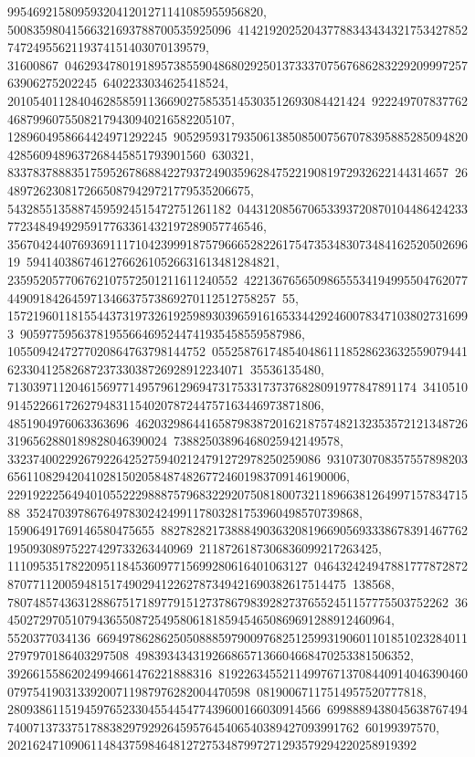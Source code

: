 {{{9954692158095932041201271141085955956820, 50083598041566321693788700535925096\
4142192025204377883434343217534278527472495562119374151403070139579, 31600867\
04629347801918957385590486802925013733370756768628322920999725763906275202245\
6402233034625418524, 20105401128404628585911366902758535145303512693084421424\
92224970783776246879960755082179430940216582205107, 1289604958664424971292245\
90529593179350613850850075670783958852850948204285609489637268445851793901560\
630321, 833783788835175952678688422793724903596284752219081972932622144314657\
2648972623081726650879429721779535206675, 54328551358874595924515472751261182\
0443120856706533937208701044864242337723484949295917763361432197289057746546, 
   35670424407693691117104239991875796665282261754735348307348416252050269619\
594140386746127662610526631613481284821, 235952057706762107572501211611240552\
42213676565098655534194995504762077449091842645971346637573869270112512758257\
55, 1572196011815544373197326192598930396591616533442924600783471038027316993\
90597759563781955664695244741935458559587986, 1055094247277020864763798144752\
05525876174854048611185286236325590794416233041258268723733038726928912234071\
35536135480, 7130397112046156977149579612969473175331737376828091977847891174\
34105109145226617262794831154020787244757163446973871806, 4851904976063363696\
46203298644165879838720162187574821323535721213487263196562880189828046390024\
73882503896468025942149578, 3323740022926792264252759402124791272978250259086\
931073070835755789820365611082942041028150205848748267724601983709146190006, 
   22919222564940105522298887579683229207508180073211896638126499715783471588\
3524703978676497830242499117803281753960498570739868, 15906491769146580475655\
88278282173888490363208196690569333867839146776219509308975227429733263440969\
2118726187306836099217263425, 11109535178220951184536097715699280616401063127\
04643242494788177787287287077112005948151749029412262787349421690382617514475\
138568, 780748574363128867517189779151273786798392827376552451157775503752262\
36450272970510794365508725495806181859454650869691288912460964, 5520377034136\
66949786286250508885979009768251259931906011018510232840112797970186403297508\
4983934343192668657136604668470253381506352, 39266155862024994661476221888316\
81922634552114997671370844091404639046007975419031339200711987976282004470598\
08190067117514957520777818, 2809386115194597652330455445477439600166030914566\
69988894380456387674947400713733751788382979292645957645406540389427093991762\
60199397570, 2021624710906114843759846481272753487997271293579294220258919392\
}}}
